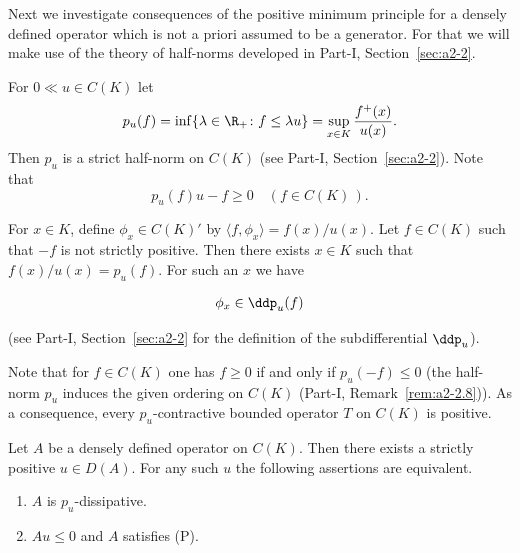 Next we investigate consequences of the positive minimum principle for a densely defined operator which is not a priori assumed to be a generator.
For that we will make use of the theory of half-norms developed in Part-I, Section~\ref{sec:a2-2}.

For $0  \ll u \in C(K)$ let
\begin{equation}\label{eq:b2-1.4}
p_{u}(f) = \inf\{\lambda \in \R_{+} \colon f \leq \lambda u\} = \sup_{x \in K} \frac{f^{+}(x)}{u(x)}.
\end{equation}
Then $p_{u}$ is a strict half-norm on $C(K)$ 
(see Part-I, Section~\ref{sec:a2-2}).
Note that
\begin{equation}\label{eq:b2-1.5}
p_{u}(f)u - f \geq 0 \quad (f \in C(K)\,).
\end{equation}

For $x \in K$, define $\phi_{x} \in C(K)'$ by $\langle f,\phi_{x} \rangle = f(x)/u(x)$.
Let $f \in C(K)$ such that $-f$ is not strictly positive.
Then there exists $x \in K$ such that $f(x)/u(x) = p_{u}(f)$.
For such an $x$ we have

\begin{equation}\label{eq:b2-1.6}
\phi_{x} \in \ddp_{u}(f)
\end{equation}


(see Part-I, Section~\ref{sec:a2-2} for the definition of the subdifferential $\ddp_{u}$).

Note that for $f \in C(K)$ one has $f \geq 0$ if and only if\/ $p_{u}(-f) \leq 0$ (\ie  the half-norm $p_{u}$ induces the given ordering on $C(K)$ (\cf Part-I, Remark~\ref{rem:a2-2.8})).
As a consequence, every $p_{u}$-contractive bounded operator $T$ on $C(K)$ is positive.

\begin{proposition}\label{prop:b2-1.10}
%
Let $A$ be a densely defined operator on $C(K)$.
Then there exists a strictly positive $u \in D(A)$.
For any such $u$ the following assertions are equivalent.
\begin{enumerate}[\upshape (a)]
\item  \label{prop:b2-1.10-1}
$A$ is $p_{u}$-dissipative.

\item  \label{prop:b2-1.10-2}
$Au \leq 0$ and $A$ satisfies (P).
\end{enumerate}
\end{proposition}


